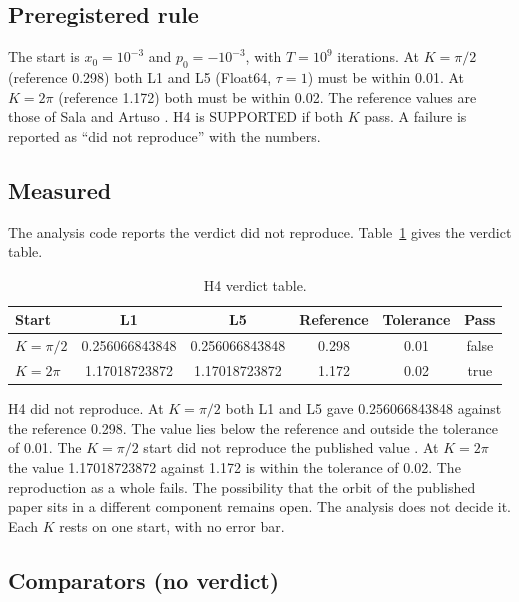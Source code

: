 \documentclass[aip,cha,reprint,amsmath,amssymb,longbibliography]{revtex4-2}
\newcommand{\tenp}[1]{\ensuremath{10^{#1}}}
\begin{document}
\subsection{Preregistered rule}

The start is $x_0=$\tenp{-3} and $p_0=-$\tenp{-3}, with $T=$\tenp{9} iterations.
At $K=\pi/2$ (reference 0.298) both L1 and L5 (Float64, $\tau=1$) must be within 0.01.
At $K=2\pi$ (reference 1.172) both must be within 0.02.
The reference values are those of Sala and Artuso \cite{SalaArtuso2015}.
H4 is SUPPORTED if both $K$ pass.
A failure is reported as ``did not reproduce'' with the numbers.

\subsection{Measured}

The analysis code reports the verdict did not reproduce.
Table~\ref{tab:h4} gives the verdict table.

\begin{table}
\caption{H4 verdict table.}
\label{tab:h4}
\begin{ruledtabular}
\begin{tabular}{lccccc}
Start & L1 & L5 & Reference & Tolerance & Pass \\
\hline
$K=\pi/2$ & 0.256066843848 & 0.256066843848 & 0.298 & 0.01 & false \\
$K=2\pi$ & 1.17018723872 & 1.17018723872 & 1.172 & 0.02 & true \\
\end{tabular}
\end{ruledtabular}
\end{table}

H4 did not reproduce.
At $K=\pi/2$ both L1 and L5 gave 0.256066843848 against the reference 0.298.
The value lies below the reference and outside the tolerance of 0.01.
The $K=\pi/2$ start did not reproduce the published value \cite{SalaArtuso2015}.
At $K=2\pi$ the value 1.17018723872 against 1.172 is within the tolerance of 0.02.
The reproduction as a whole fails.
The possibility that the orbit of the published paper sits in a different component remains open.
The analysis does not decide it.
Each $K$ rests on one start, with no error bar.

\subsection{Comparators (no verdict)}
\label{sub:comp}
\end{document}
